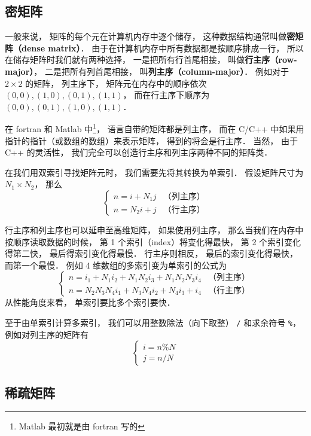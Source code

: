 
\begin{issues}
\issueTODO
\end{issues}

\subsection{密矩阵}
一般来说， 矩阵的每个元在计算机内存中逐个储存， 这种数据结构通常叫做\textbf{密矩阵（dense matrix）}． 由于在计算机内存中所有数据都是按顺序排成一行， 所以在储存矩阵时我们就有两种选择， 一是把所有行首尾相接， 叫做\textbf{行主序（row-major）}， 二是把所有列首尾相接， 叫\textbf{列主序（column-major）}． 例如对于 $2 \times 2$ 的矩阵， 列主序下， 矩阵元在内存中的顺序依次 $(0, 0), (1, 0), (0, 1), (1, 1)$， 而在行主序下顺序为 $(0, 0), (0, 1), (1, 0), (1, 1)$．

在 fortran 和 Matlab 中\footnote{Matlab 最初就是由 fortran 写的}， 语言自带的矩阵都是列主序， 而在 C/C++ 中如果用指针的指针（或数组的数组）来表示矩阵， 得到的将会是行主序． 当然， 由于 C++ 的灵活性， 我们完全可以创造行主序和列主序两种不同的矩阵类．

在我们用双索引寻找矩阵元时， 我们需要先将其转换为单索引． 假设矩阵尺寸为 $N_1 \times N_2$， 那么
\begin{equation}
\begin{cases}
n = i + N_1 j  &\text{（列主序）}\\
n = N_2 i + j  &\text{（行主序）}
\end{cases}
\end{equation}

行主序和列主序也可以延申至高维矩阵， 如果使用列主序， 那么当我们在内存中按顺序读取数据的时候， 第 1 个索引（index）将变化得最快， 第 2 个索引变化得第二快， 最后得索引变化得最慢． 行主序则相反， 最后的索引变化得最快， 而第一个最慢． 例如 4 维数组的多索引变为单索引的公式为
\begin{equation}
\begin{cases}
n = i_1 + N_1 i_2 + N_1 N_2 i_3 + N_1 N_2 N_3 i_4  &\text{（列主序）}\\
n = N_2 N_3 N_4 i_1 + N_3 N_4 i_2 + N_4 i_3 + i_4  &\text{（行主序）}
\end{cases}
\end{equation}
从性能角度来看， 单索引要比多个索引要快．

至于由单索引计算多索引， 我们可以用整数除法（向下取整） \verb|/| 和求余符号 \verb|%|， 例如对列主序的矩阵有
\begin{equation}
\begin{cases}
i = n \% N\\
j = n / N
\end{cases}
\end{equation}

\subsection{稀疏矩阵}
